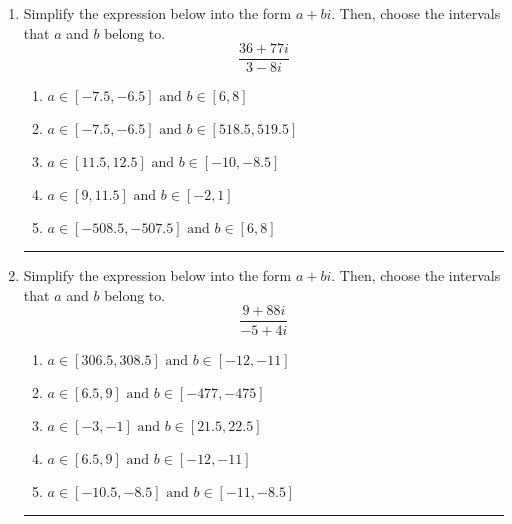 \documentclass[14pt]{extbook}
\newcommand{\litem}[1]{\item#1\hspace*{-1cm}\rule{\textwidth}{0.4pt}}
\begin{document}
\begin{enumerate}
{\begin{enumerate}[label=\Alph*.]
\end{enumerate} }
\litem{
Simplify the expression below into the form $a+bi$. Then, choose the intervals that $a$ and $b$ belong to.\[ \frac{36 + 77 i}{3 - 8 i} \]\begin{enumerate}[label=\Alph*.]
\item \( a \in [-7.5, -6.5] \text{ and } b \in [6, 8] \)
\item \( a \in [-7.5, -6.5] \text{ and } b \in [518.5, 519.5] \)
\item \( a \in [11.5, 12.5] \text{ and } b \in [-10, -8.5] \)
\item \( a \in [9, 11.5] \text{ and } b \in [-2, 1] \)
\item \( a \in [-508.5, -507.5] \text{ and } b \in [6, 8] \)

\end{enumerate} }
\litem{
Simplify the expression below into the form $a+bi$. Then, choose the intervals that $a$ and $b$ belong to.\[ \frac{9 + 88 i}{-5 + 4 i} \]\begin{enumerate}[label=\Alph*.]
\item \( a \in [306.5, 308.5] \text{ and } b \in [-12, -11] \)
\item \( a \in [6.5, 9] \text{ and } b \in [-477, -475] \)
\item \( a \in [-3, -1] \text{ and } b \in [21.5, 22.5] \)
\item \( a \in [6.5, 9] \text{ and } b \in [-12, -11] \)
\item \( a \in [-10.5, -8.5] \text{ and } b \in [-11, -8.5] \)

\end{enumerate} }
\end{enumerate}
\end{document}

